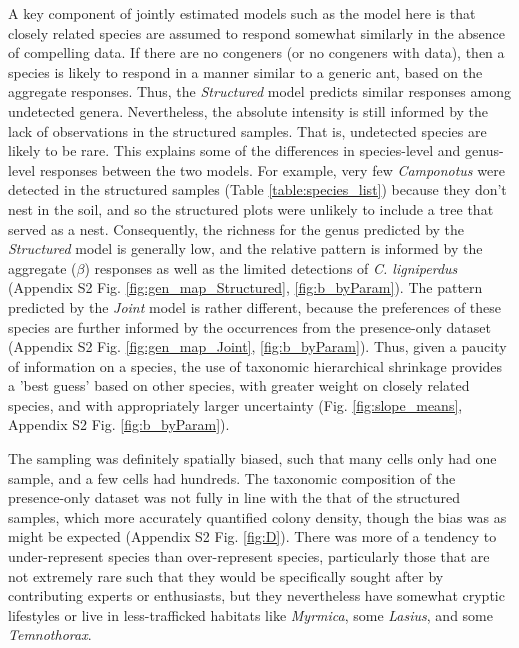 \documentclass[preprint,final,times,12pt,3p]{elsarticle}
\begin{document}
A key component of jointly estimated models such as the model here is that closely related species are assumed to respond somewhat similarly in the absence of compelling data. If there are no congeners (or no congeners with data), then a species is likely to respond in a manner similar to a generic ant, based on the aggregate responses. Thus, the \emph{Structured} model predicts similar responses among undetected genera. Nevertheless, the absolute intensity is still informed by the lack of observations in the structured samples. That is, undetected species are likely to be rare. This explains some of the differences in species-level and genus-level responses between the two models. For example, very few \emph{Camponotus} were detected in the structured samples (Table \ref{table:species_list}) because they don't nest in the soil, and so the structured plots were unlikely to include a tree that served as a nest. Consequently, the richness for the genus predicted by the \emph{Structured} model is generally low, and the relative pattern is informed by the aggregate ($\beta$) responses as well as the limited detections of \emph{C. ligniperdus} (Appendix S2 Fig. \ref{fig:gen_map_Structured}, \ref{fig:b_byParam}). The pattern predicted by the \emph{Joint} model is rather different, because the preferences of these species are further informed by the occurrences from the presence-only dataset (Appendix S2 Fig. \ref{fig:gen_map_Joint}, \ref{fig:b_byParam}). Thus, given a paucity of information on a species, the use of taxonomic hierarchical shrinkage provides a 'best guess' based on other species, with greater weight on closely related species, and with appropriately larger uncertainty (Fig. \ref{fig:slope_means}, Appendix S2 Fig. \ref{fig:b_byParam}).

The sampling was definitely spatially biased, such that many cells only had one sample, and a few cells had hundreds. The taxonomic composition of the presence-only dataset was not fully in line with the that of the structured samples, which more accurately quantified colony density, though the bias was as might be expected (Appendix S2 Fig. \ref{fig:D}). There was more of a tendency to under-represent species than over-represent species, particularly those that are not extremely rare such that they would be specifically sought after by contributing experts or enthusiasts, but they nevertheless have somewhat cryptic lifestyles or live in less-trafficked habitats like \emph{Myrmica}, some \emph{Lasius}, and some \emph{Temnothorax}. 
\end{document}
